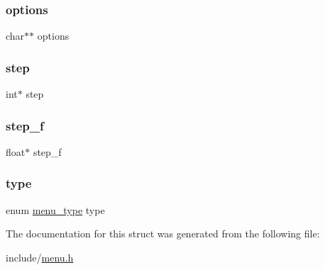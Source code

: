 \subsubsection{\texorpdfstring{options}{options}}
{\footnotesize\ttfamily char$\ast$$\ast$ options}

\mbox{\label{structmenu_a985265c90800ba09664f71e134dd5786}} 
\subsubsection{\texorpdfstring{step}{step}}
{\footnotesize\ttfamily int$\ast$ step}

\mbox{\label{structmenu_ad30508910252066b5c8e1c574080b736}} 
\subsubsection{\texorpdfstring{step\+\_\+f}{step\_f}}
{\footnotesize\ttfamily float$\ast$ step\+\_\+f}

\mbox{\label{structmenu_ae131df142b529116ec8300a3c59b14be}} 
\subsubsection{\texorpdfstring{type}{type}}
{\footnotesize\ttfamily enum \hyperlink{menu_8h_a6bbf4baf5018b0d76aab6c2e6bf85e62}{menu\+\_\+type} type}



The documentation for this struct was generated from the following file\+:\begin{DoxyCompactItemize}
\item 
include/\hyperlink{menu_8h}{menu.\+h}\end{DoxyCompactItemize}
